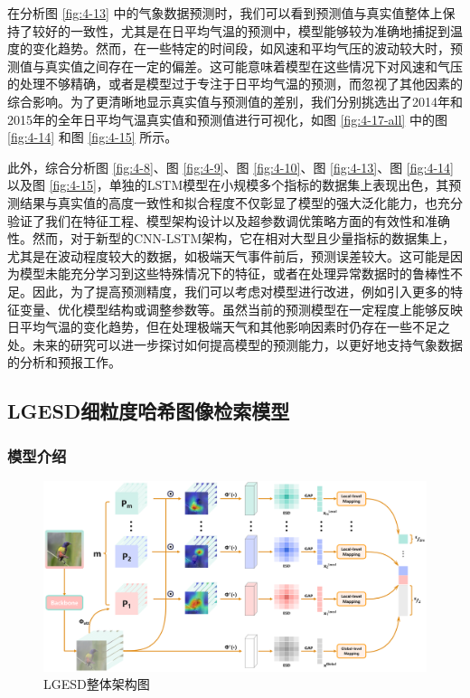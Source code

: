 在分析图 \ref{fig:4-13} 中的气象数据预测时，我们可以看到预测值与真实值整体上保持了较好的一致性，尤其是在日平均气温的预测中，模型能够较为准确地捕捉到温度的变化趋势。然而，在一些特定的时间段，如风速和平均气压的波动较大时，预测值与真实值之间存在一定的偏差。这可能意味着模型在这些情况下对风速和气压的处理不够精确，或者是模型过于专注于日平均气温的预测，而忽视了其他因素的综合影响。为了更清晰地显示真实值与预测值的差别，我们分别挑选出了2014年和2015年的全年日平均气温真实值和预测值进行可视化，如图 \ref{fig:4-17-all} 中的图 \ref{fig:4-14} 和图 \ref{fig:4-15} 所示。


此外，综合分析图 \ref{fig:4-8}、图 \ref{fig:4-9}、图 \ref{fig:4-10}、图 \ref{fig:4-13}、图 \ref{fig:4-14} 以及图 \ref{fig:4-15}，单独的LSTM模型在小规模多个指标的数据集上表现出色，其预测结果与真实值的高度一致性和拟合程度不仅彰显了模型的强大泛化能力，也充分验证了我们在特征工程、模型架构设计以及超参数调优策略方面的有效性和准确性。然而，对于新型的CNN-LSTM架构，它在相对大型且少量指标的数据集上，尤其是在波动程度较大的数据，如极端天气事件前后，预测误差较大。这可能是因为模型未能充分学习到这些特殊情况下的特征，或者在处理异常数据时的鲁棒性不足。因此，为了提高预测精度，我们可以考虑对模型进行改进，例如引入更多的特征变量、优化模型结构或调整参数等。虽然当前的预测模型在一定程度上能够反映日平均气温的变化趋势，但在处理极端天气和其他影响因素时仍存在一些不足之处。未来的研究可以进一步探讨如何提高模型的预测能力，以更好地支持气象数据的分析和预报工作。



\subsection{LGESD细粒度哈希图像检索模型}

\subsubsection{模型介绍}

\begin{figure}[h]
  \centering
  \includegraphics[width=1.0\textwidth]{./Img/完整架构图.pdf}
  \caption{LGESD整体架构图}\label{fig:4-21}
\end{figure}


